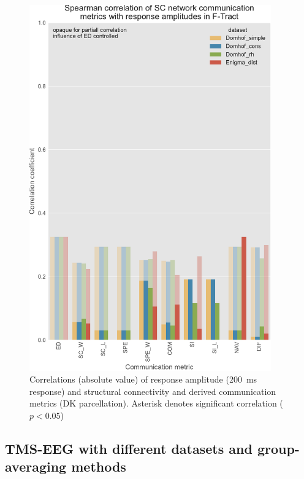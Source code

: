 \begin{figure}
    \centering
    \includegraphics[width=0.93\textwidth]{images/nootebook_generated/ftract_results/DKT/5/ED0/0.25/long/Spearman_correlation_of_SC_network_communication_metrics_with_response_amplitudes_in_F-Tract.pdf}
    \caption[F-Tract amplitude correlations - all $SC$ matrices (DK)]{Correlations (absolute value) of response amplitude (200~ms response) and structural connectivity and derived communication metrics (DK parcellation). Asterisk denotes significant correlation ($p<0.05$)}
    \label{fig:ftract_alldata_long_amplitudes_DK}
\end{figure}

\subsection{TMS-EEG with different datasets and group-averaging methods}

